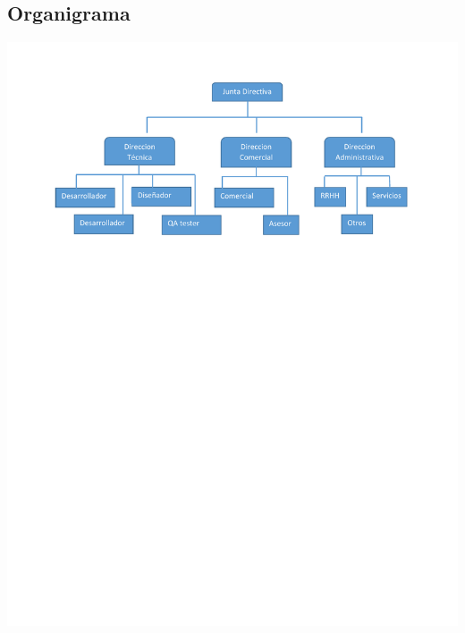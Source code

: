 \subsection{Organigrama}
\includegraphics[width=\linewidth,trim={ 2cm 18.5cm 2cm 0 },clip]{Proyecto/Metodologia/imgs/Organigrama.pdf}